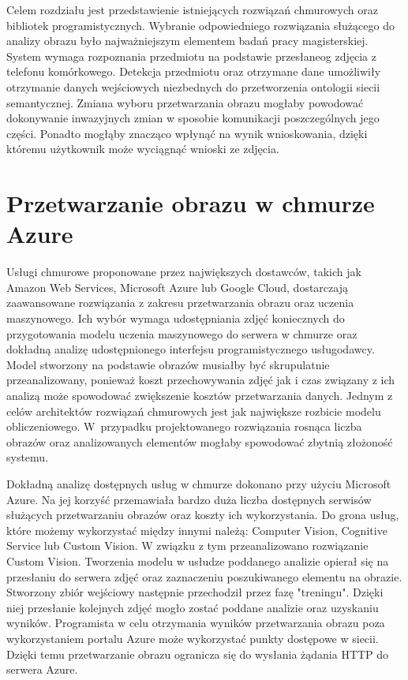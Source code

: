 Celem rozdziału jest przedstawienie istniejących rozwiązań chmurowych oraz bibliotek programistycznych. Wybranie odpowiedniego rozwiązania służącego do analizy obrazu było najważniejszym elementem badań pracy magisterskiej. System wymaga rozpoznania przedmiotu na podstawie przesłaneog zdjęcia z telefonu komórkowego. Detekcja przedmiotu oraz otrzymane dane umożliwiły otrzymanie danych wejściowych niezbednych do przetworzenia ontologii siecii semantycznej. Zmiana wyboru przetwarzania obrazu mogłaby powodować dokonywanie inwazyjnych zmian w sposobie komunikacji poszczególnych jego części. Ponadto mogłąby znacząco wpłynąć na wynik wnioskowania, dzięki któremu użytkownik może wyciągnąć wnioski ze zdjęcia.

\section{Przetwarzanie obrazu w chmurze Azure} {
Usługi chmurowe proponowane przez największych dostawców, takich jak Amazon Web Services, Microsoft Azure lub Google Cloud, dostarczają zaawansowane rozwiązania z zakresu przetwarzania obrazu oraz uczenia maszynowego. Ich wybór wymaga udostępniania zdjęć koniecznych do przygotowania modelu uczenia maszynowego do serwera w chmurze oraz dokładną analizę udostępnionego interfejsu programistycznego usługodawcy. Model stworzony na podstawie obrazów musiałby być skrupulatnie przeanalizowany, ponieważ koszt przechowywania zdjęć jak i czas związany z ich analizą może spowodować zwiększenie kosztów przetwarzania danych. Jednym z celów architektów rozwiązań chmurowych jest jak największe rozbicie modelu obliczeniowego. W~przypadku projektowanego rozwiązania rosnąca liczba obrazów oraz analizowanych elementów mogłaby spowodować zbytnią złożoność systemu. 

Dokładną analizę dostępnych usług w chmurze dokonano przy użyciu Microsoft Azure. Na jej korzyść przemawiała bardzo duża liczba dostępnych serwisów służących przetwarzaniu obrazów oraz koszty ich wykorzystania. Do grona usług, które możemy wykorzystać między innymi należą: Computer Vision, Cognitive Service lub Custom Vision. W związku z tym przeanalizowano rozwiązanie Custom Vision. Tworzenia modelu w usłudze poddanego analizie opierał się na przesłaniu do serwera zdjęć oraz zaznaczeniu poszukiwanego elementu na obrazie. Stworzony zbiór wejściowy następnie przechodził przez fazę "treningu". Dzięki niej przesłanie kolejnych zdjęć mogło zostać poddane analizie oraz uzyskaniu wyników. Programista w celu otrzymania wyników przetwarzania obrazu poza wykorzystaniem portalu Azure może wykorzystać punkty dostępowe w siecii. Dzięki temu przetwarzanie obrazu ogranicza się do wysłania żądania HTTP do serwera Azure.

}
